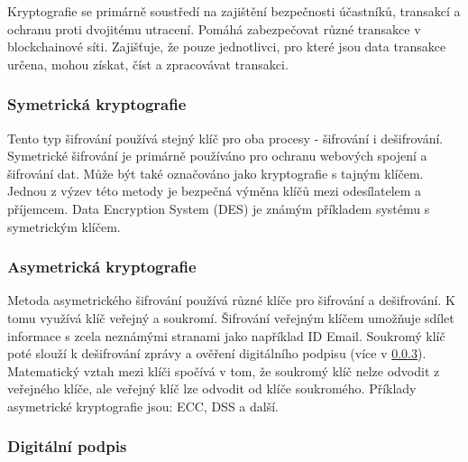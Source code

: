 Kryptografie se primárně soustředí na zajištění bezpečnosti účastníků, transakcí a ochranu proti dvojitému utracení. Pomáhá zabezpečovat různé transakce v blockchainové síti. Zajišťuje, že pouze jednotlivci, pro které jsou data transakce určena, mohou získat, číst a zpracovávat transakci. \cite{Kryptografie v Blockchain}





\subsubsection{Symetrická kryptografie}\label{subsubsec:SymKrypt}

Tento typ šifrování používá stejný klíč pro oba procesy - šifrování i dešifrování. Symetrické šifrování je primárně používáno pro ochranu webových spojení a šifrování dat. Může být také označováno jako kryptografie s tajným klíčem. Jednou z výzev této metody je bezpečná výměna klíčů mezi odesílatelem a příjemcem. Data Encryption System (DES) je známým příkladem systému s symetrickým klíčem. \cite{Kryptografie v Blockchain}




\subsubsection{Asymetrická kryptografie}\label{subsubsec:AsymKrypt}

Metoda asymetrického šifrování používá různé klíče pro šifrování a dešifrování. K tomu využívá klíč veřejný a soukromí. Šifrování veřejným klíčem umožňuje sdílet informace s zcela neznámými stranami jako například ID Email. Soukromý klíč poté slouží k dešifrování zprávy a ověření digitálního podpisu (více v \ref{subsubsec:DigSig}). Matematický vztah mezi klíči spočívá v tom, že soukromý klíč nelze odvodit z veřejného klíče, ale veřejný klíč lze odvodit od klíče soukromého. Příklady asymetrické kryptografie jsou: ECC, DSS a další. \cite{Sifrovani}







\subsubsection{Digitální podpis}\label{subsubsec:DigSig}


